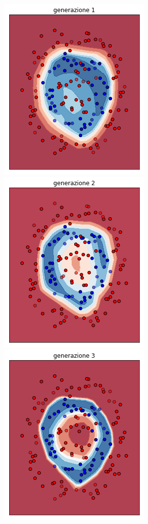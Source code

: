 \documentclass[12pt,a4paper]{report}
\begin{document}
\begin{figure}[H]
 \centering
 \includegraphics[scale = 0.3]{images/circle+-rnd-acc./1}
 \includegraphics[scale = 0.3]{images/circle+-rnd-acc./2}
 \includegraphics[scale = 0.3]{images/circle+-rnd-acc./3}

\end{figure}
\end{document}
